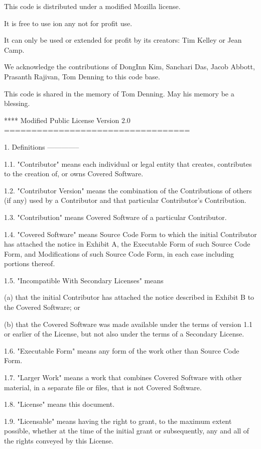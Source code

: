 This code is distributed under a modified Mozilla license.

It is free to use ion any not for profit use.

It can only be used or extended for profit by its creators: Tim Kelley or Jean Camp.

We acknowledge the contributions of DongInn Kim, Sanchari Das, Jacob Abbott, Prasanth Rajivan, Tom Denning to this code base.

This code is shared in the memory of Tom Denning. May his memory be a blessing. 


****
Modified Public License Version 2.0
==================================

1. Definitions
--------------

1.1. "Contributor"
    means each individual or legal entity that creates, contributes to
    the creation of, or owns Covered Software.

1.2. "Contributor Version"
    means the combination of the Contributions of others (if any) used
    by a Contributor and that particular Contributor's Contribution.

1.3. "Contribution"
    means Covered Software of a particular Contributor.

1.4. "Covered Software"
    means Source Code Form to which the initial Contributor has attached
    the notice in Exhibit A, the Executable Form of such Source Code
    Form, and Modifications of such Source Code Form, in each case
    including portions thereof.

1.5. "Incompatible With Secondary Licenses"
    means

    (a) that the initial Contributor has attached the notice described
        in Exhibit B to the Covered Software; or

    (b) that the Covered Software was made available under the terms of
        version 1.1 or earlier of the License, but not also under the
        terms of a Secondary License.

1.6. "Executable Form"
    means any form of the work other than Source Code Form.

1.7. "Larger Work"
    means a work that combines Covered Software with other material, in 
    a separate file or files, that is not Covered Software.

1.8. "License"
    means this document.

1.9. "Licensable"
    means having the right to grant, to the maximum extent possible,
    whether at the time of the initial grant or subsequently, any and
    all of the rights conveyed by this License.

